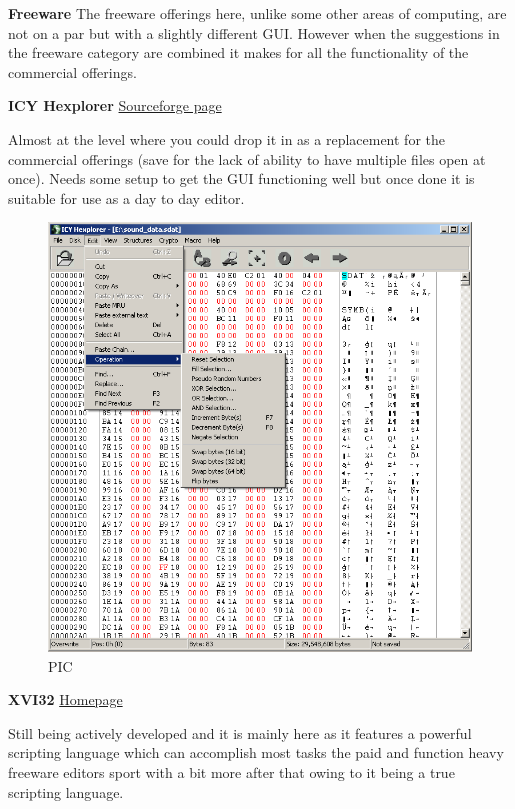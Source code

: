 \documentclass[
]{book}
\begin{document}
\textbf{Freeware} The freeware offerings here, unlike some other areas of computing, are not on a par but with a slightly different GUI. However when the suggestions in the freeware category are combined it makes for all the functionality of the commercial offerings.

\textbf{ICY Hexplorer} \href{http://hexplorer.sourceforge.net/}{Sourceforge page}

Almost at the level where you could drop it in as a replacement for the commercial offerings (save for the lack of ability to have multiple files open at once). Needs some setup to get the GUI functioning well but once done it is suitable for use as a day to day editor.

\begin{figure}
\centering
\includegraphics{images/3_home_fast6191_romhackingguide_unrenamed_files___hackingguidehexeditorsshowcaseICYHexplorer1.png}
\caption{PIC}
\end{figure}

\textbf{XVI32} \href{http://www.chmaas.handshake.de/delphi/freeware/xvi32/xvi32.htm}{Homepage}

Still being actively developed and it is mainly here as it features a powerful scripting language which can accomplish most tasks the paid and function heavy freeware editors sport with a bit more after that owing to it being a true scripting language.
\end{document}
